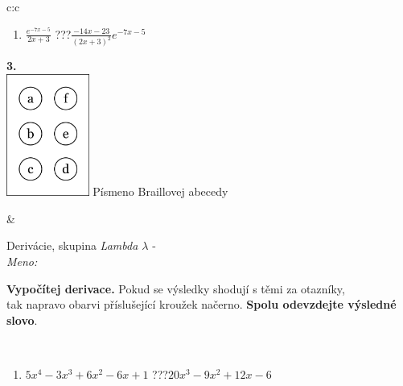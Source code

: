 \documentclass[10pt]{report}
\begin{document}
\begin{tabular}{c:c}
\begin{minipage}[c][104.5mm][t]{0.5\linewidth}
\begin{center}
\begin{minipage}{0.79\linewidth}
\begin{center}
\begin{varwidth}{\linewidth}
\begin{enumerate}
\item $\frac{e^{-7x-5}}{2x+3}$\quad \dotfill\; ???\;\dotfill \quad $\frac{-14x-23}{(2x+3)^2}e^{-7x-5}$
\end{enumerate}
\end{varwidth}
\end{center}
\end{minipage}
\begin{minipage}{0.20\linewidth}
\begin{center}
{\Huge\bfseries 3.} \\[2mm]
\includegraphics[height=40mm]{../images/braille.png}
{\small Písmeno Braillovej abecedy}
\end{center}
\end{minipage}
\end{center}
\end{minipage}
&
\begin{minipage}[c][104.5mm][t]{0.5\linewidth}
\begin{center}
\vspace{7mm}
{\huge Derivácie, skupina \textit{Lambda $\lambda$} -}\\[5mm]
\textit{Meno:}\phantom{xxxxxxxxxxxxxxxxxxxxxxxxxxxxxxxxxxxxxxxxxxxxxxxxxxxxxxxxxxxxxxxxx}\\[5mm]
\begin{minipage}{0.95\linewidth}
\begin{center}
\textbf{Vypočítej derivace.} Pokud se výsledky shodují s těmi za otazníky,\\tak napravo obarvi příslušející kroužek načerno. \textbf{Spolu odevzdejte výsledné slovo}.
\end{center}
\end{minipage}
\\[1mm]
\begin{minipage}{0.79\linewidth}
\begin{center}
\begin{varwidth}{\linewidth}
\begin{enumerate}
\normalsize
\item $5x^4-3x^3+6x^2-6x+1$\quad \dotfill\; ???\;\dotfill \quad $20x^3-9x^2+12x-6$

\end{enumerate}
\end{varwidth}
\end{center}
\end{minipage}
\end{center}
\end{minipage}
\end{tabular}
\end{document}
